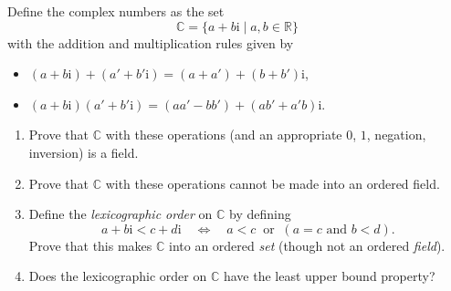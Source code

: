 \documentclass[12pt,letterpaper,reqno]{amsart}
\numberwithin{equation}{section}
\newcommand{\R}{\ensuremath{\mathbb R}}
\newcommand{\C}{\ensuremath{\mathbb C}}
\newcommand{\Q}{\ensuremath{\mathbb Q}}
\newcommand{\I}{{\mathrm i}}
\begin{document}
\begin{exercise}

Define the complex numbers as the set 
\begin{equation}
\C= \{a+b \I \mid a,b \in \R \}
\end{equation}
with the addition and multiplication rules given by
\begin{itemize}
\item $(a+b\I)+(a'+b'\I) = (a+a') + (b+b')\I$,
\item $(a+b\I)(a'+b'\I) = (aa'-bb') + (ab'+a'b)\I$.
\end{itemize}
\begin{enumerate}
\item Prove that $\C$ with these operations (and an appropriate $0$, $1$, negation, inversion) is a field.
\item Prove that $\C$ with these operations cannot be made into an ordered field.
\item Define the \emph{lexicographic order} on $\C$ by defining 
\begin{equation}
a+b\I<c+d\I \quad \iff \quad a<c \ \text{ or } \ (a=c \text{ and } b<d). 
\end{equation}
Prove that this makes $\C$ into an ordered \emph{set} (though not an ordered \emph{field}).
  
\item Does the lexicographic order on $\C$ have the least upper bound property?
\end{enumerate}

\end{exercise}






\end{document}
